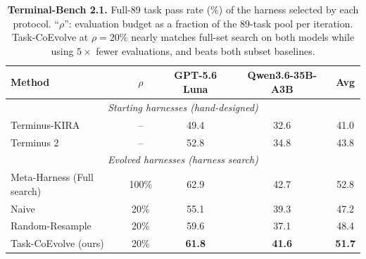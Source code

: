 \begin{table}[t]
\centering
\caption{\textbf{Terminal-Bench 2.1.} Full-89 task pass rate (\%) of the harness
selected by each protocol. ``$\rho$'':
evaluation budget as a fraction of the 89-task pool per iteration.
Task-CoEvolve at $\rho{=}20\%$ nearly matches full-set search on both models
while using $5\times$ fewer evaluations, and beats both subset baselines.}
\label{table:tb2_results}
\small
\setlength{\tabcolsep}{6pt}
\begin{tabular}{lcccc}
\toprule
\textbf{Method} & {\boldmath$\rho$} & \textbf{GPT-5.6 Luna} & \textbf{Qwen3.6-35B-A3B} & \textbf{Avg} \\
\midrule
\multicolumn{5}{c}{\textit{Starting harnesses (hand-designed)}} \\
\midrule
Terminus-KIRA & -- & 49.4 & 32.6 & 41.0 \\
Terminus 2 & -- & 52.8 & 34.8 & 43.8 \\
\midrule[\heavyrulewidth]
\multicolumn{5}{c}{\textit{Evolved harnesses (harness search)}} \\
\midrule
Meta-Harness (Full search) & 100\% & 62.9 & 42.7 & 52.8 \\
\midrule
Naive & 20\% & 55.1 & 39.3 & 47.2 \\
Random-Resample & 20\% & 59.6 & 37.1 & 48.4 \\
Task-CoEvolve (ours) & 20\% & \textbf{61.8} & \textbf{41.6} & \textbf{51.7} \\
\bottomrule
\end{tabular}
\end{table}
